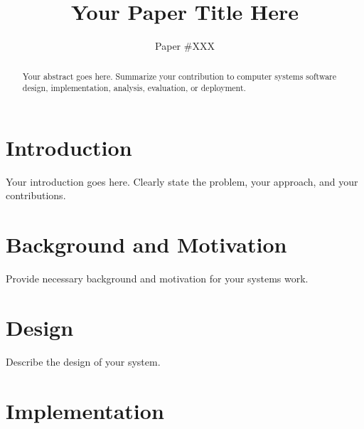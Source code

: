 \documentclass[sigplan,10pt]{acmart}
\begin{document}
\title{Your Paper Title Here}

\author{Paper \#XXX}
\affiliation{}


\begin{abstract}
Your abstract goes here. Summarize your contribution to computer systems
software design, implementation, analysis, evaluation, or deployment.
\end{abstract}

\maketitle
\pagestyle{plain}

\section{Introduction}
\label{sec:intro}

%

Your introduction goes here. Clearly state the problem, your approach,
and your contributions.

\section{Background and Motivation}
\label{sec:background}

Provide necessary background and motivation for your systems work.

\section{Design}
\label{sec:design}

Describe the design of your system.

\section{Implementation}
\label{sec:implementation}
\end{document}
